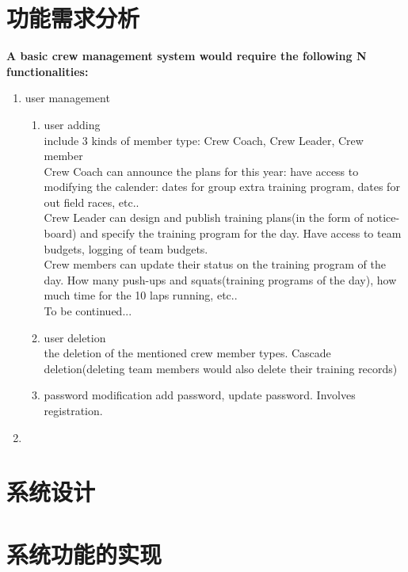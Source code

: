 \section{功能需求分析}
\textbf{A basic crew management system would require the following N functionalities:}
\begin{enumerate}
\item
  {user management
    \begin{enumerate}
    \item{user adding\\
        include 3 kinds of member type: Crew Coach, Crew Leader, Crew member\\
        
        Crew Coach can announce the plans for this year: have access to
        modifying the calender: dates for group extra training program, dates for out
        field races, etc..\\
        
        Crew Leader can design and publish training plans(in the form of
        notice-board) and specify the training program for the day. Have access
        to team budgets, logging of team budgets.\\
        
        Crew members can update their status on the training program of the day.
        How many push-ups and squats(training programs of the day), how much time
        for the 10 laps running, etc..\\
        
        To be continued...
        }
      \item{user deletion\\
          the deletion of the mentioned crew member types. Cascade deletion(deleting
          team members would also delete their training records)
        }
      \item{password modification
          add password, update password. Involves registration.\\
        }
    \end{enumerate}
  }
\item {}
  
\end{enumerate}
\section{系统设计}

\section{系统功能的实现}

